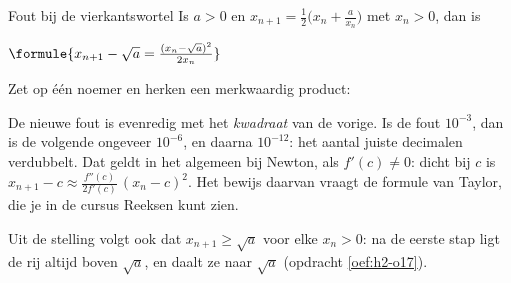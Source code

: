 \begin{theorie}
\begin{stelling}{Fout bij de vierkantswortel}
Is $a > 0$ en $x_{n+1} = \frac12\bigl(x_n + \frac{a}{x_n}\bigr)$ met $x_n > 0$, dan is

\vspace{1mm}
\qquad $\formule{x_{n+1} - \sqrt a = \frac{(x_n - \sqrt a)^2}{2x_n}}$
\end{stelling}

\begin{bewijs}
Zet op één noemer en herken een merkwaardig product:
\end{bewijs}
\end{theorie}

De nieuwe fout is evenredig met het \textit{kwadraat} van de vorige. Is de fout $10^{-3}$, dan is de volgende ongeveer $10^{-6}$, en daarna $10^{-12}$: het aantal juiste decimalen verdubbelt. Dat geldt in het algemeen bij Newton, als $f'(c) \neq 0$: dicht bij $c$ is $x_{n+1} - c \approx \frac{f''(c)}{2f'(c)}\,(x_n - c)^2$. Het bewijs daarvan vraagt de formule van Taylor, die je in de cursus Reeksen kunt zien.

Uit de stelling volgt ook dat $x_{n+1} \geqslant \sqrt a$ voor elke $x_n > 0$: na de eerste stap ligt de rij altijd boven $\sqrt a$, en daalt ze naar $\sqrt a$ (opdracht \ref{oef:h2-o17}).


